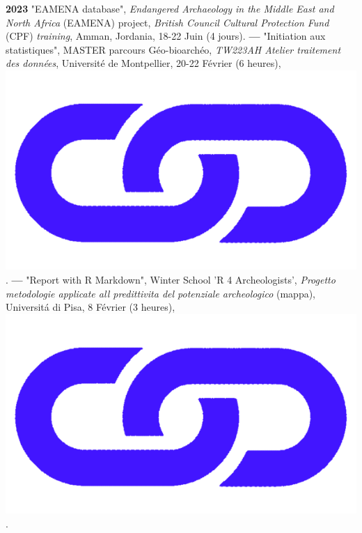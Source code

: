 \documentclass{article}
\begin{document}
\textbf{2023 }"EAMENA database", \textit{Endangered Archaeology in the Middle East and North Africa} (EAMENA) project, \textit{British Council Cultural Protection Fund} (CPF) \textit{training}, Amman, Jordania, 18-22 Juin (4 jours).
\smallbreak
\textbf{--- }"Initiation aux statistiques", MASTER parcours Géo-bioarchéo, \textit{TW223AH Atelier traitement des données}, Universit\'{e} de Montpellier, 20-22 Février (6 heures), \href{http://shinyserver.cfs.unipi.it:3838/teach/stats/upv/_site/#/title-slide}{\includegraphics[scale=0.02]{link_darkblue.png}}.
\smallbreak
\textbf{--- }"Report with R Markdown", Winter School 'R 4 Archeologists', \textit{Progetto metodologie applicate all predittivita del potenziale archeologico} (mappa), Universit\'{a} di Pisa, 8 Février (3 heures), \href{https://zoometh.github.io/thomashuet/teach/stats/r4a}{\includegraphics[scale=0.02]{link_darkblue.png}}.
\smallbreak
\end{document}
